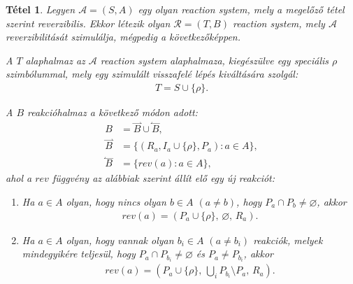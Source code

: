 \documentclass[12pt]{article}
\theoremstyle{definition}
\theoremstyle{remark}
\theoremstyle{plain}
\newtheorem*{theorem*}{Tétel}
\let\emptyset\varnothing
\newcommand{\forwardhat}{\overset{\rightharpoonup}}
\newcommand{\backwardhat}{\overset{\leftharpoonup}}
\newcommand{\reaction}[3]{
    (#1, \, #2, \, #3)
}
\begin{document}
    \begin{theorem*}
        Legyen $\mathscr{A} = (S, A)$ egy olyan \textit{reaction system}, mely a megelőző tétel szerint reverzibilis. Ekkor létezik olyan $\mathscr{R} = (T, B)$ \textit{reaction system}, mely $\mathscr{A}$ reverzibilitását szimulálja, mégpedig a következőképpen.
        
        A $T$ alaphalmaz az $\mathscr{A}$ \textit{reaction system} alaphalmaza, kiegészülve egy speciális $\rho$ szimbólummal, mely egy szimulált visszafelé lépés kiváltására szolgál:
        \begin{align*}
            T = S \cup \{ \rho \}.
        \end{align*}

        A $B$ reakcióhalmaz a következő módon adott:
        \begin{align*}
            B &= \forwardhat B \cup \backwardhat B, \\
            \forwardhat B &= \{ (R_{a}, I_{a} \cup \{ \rho \}, P_{a}) : a \in A\}, \\
            \backwardhat B &= \{ \textit{rev}(a) : a \in A \},
        \end{align*}
        ahol a $\textit{rev}$ függvény az alábbiak szerint állít elő egy új reakciót:
        \begin{enumerate}[label={(\arabic*)}]
            \item
            Ha $a \in A$ olyan, hogy nincs olyan $b \in A$ $(a \neq b)$, hogy $P_{a} \cap P_{b} \neq \emptyset$, akkor
            \begin{align*}
                \textit{rev}(a) = \reaction{P_{a} \cup \{ \rho \}}{\emptyset}{R_{a}}.
            \end{align*}

            \item
            Ha $a \in A$ olyan, hogy vannak olyan $b_{i} \in A$ $(a \neq b_{i})$ reakciók, melyek mindegyikére teljesül, hogy $P_{a} \cap P_{b_{i}} \neq \emptyset$ és $P_{a} \neq P_{b_{i}}$, akkor
            \begin{align*}
                \textit{rev}(a) = \reaction{P_{a} \cup \{ \rho \}}{\bigcup\limits_{i}P_{b_{i}} \setminus P_{a}}{R_{a}}.
            \end{align*}


\end{enumerate}
\end{theorem*}
\end{document}
